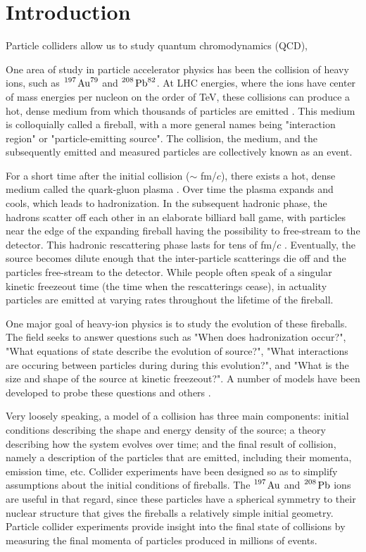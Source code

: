 \section{Introduction}


Particle colliders allow us to study quantum chromodynamics (QCD), 


One area of study in particle accelerator physics has been the collision of heavy ions, such as $\ce{^197 \mathrm{Au}^79}$ and $\ce{^208 \mathrm{Pb}^82}$.
At LHC energies, where the ions have center of mass energies per nucleon on the order of TeV, these collisions can produce a hot, dense medium from which thousands of particles are emitted \cite{...}.
This medium is colloquially called a fireball, with a more general names being "interaction region" or "particle-emitting source".
The collision, the medium, and the subsequently emitted and measured particles are collectively known as an event. 

For a short time after the initial collision ($\sim$ fm/$c$), there exists a hot, dense medium called the quark-gluon plasma \cite{...}.
Over time the plasma expands and cools, which leads to hadronization.
In the subsequent hadronic phase, the hadrons scatter off each other in an elaborate billiard ball game, with particles near the edge of the expanding fireball having the possibility to free-stream to the detector.
This hadronic rescattering phase lasts for tens of fm/$c$ \cite{...}.
Eventually, the source becomes dilute enough that the inter-particle scatterings die off and the particles free-stream to the detector.
While people often speak of a singular kinetic freezeout time (the time when the rescatterings cease), in actuality particles are emitted at varying rates throughout the lifetime of the fireball.


One major goal of heavy-ion physics is to study the evolution of these fireballs.
The field seeks to answer questions such as "When does hadronization occur?", "What equations of state describe the evolution of source?", "What interactions are occuring between particles during during this evolution?", and "What is the size and shape of the source at kinetic freezeout?".
A number of models have been developed to probe these questions and others \cite{...,...,...,...}.

Very loosely speaking, a model of a collision has three main components: initial conditions describing the shape and energy density of the source; a theory describing how the system evolves over time; and the final result of collision, namely a description of the particles that are emitted, including their momenta, emission time, etc.
Collider experiments have been designed so as to simplify assumptions about the initial conditions of fireballs.
The $\ce{^197 \mathrm{Au}}$ and $\ce{^208 \mathrm{Pb}}$ ions are useful in that regard, since these particles have a spherical symmetry to their nuclear structure that gives the fireballs a relatively simple initial geometry.
Particle collider experiments provide insight into the final state of collisions by measuring the final momenta of particles produced in millions of events.



